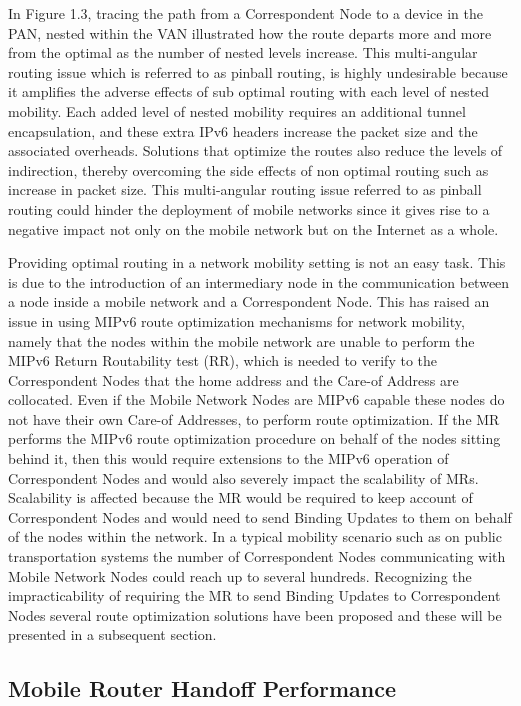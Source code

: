 In Figure 1.3, tracing the path from a Correspondent Node to a device in the
PAN, nested within the VAN illustrated how the route departs more and more
from the optimal as the number of nested levels increase. This multi-angular
routing issue which is referred to as pinball routing, is highly undesirable
because it amplifies the adverse effects of sub optimal routing with each
level of nested mobility. Each added level of nested mobility requires an
additional tunnel encapsulation, and these extra IPv6 headers increase the
packet size and the associated overheads. Solutions that optimize the routes
also reduce the levels of indirection, thereby overcoming the side effects of
non optimal routing such as increase in packet size. This multi-angular routing issue referred to as pinball routing could hinder the deployment of mobile networks since it gives rise to a negative impact not only on the mobile network but on the Internet as a whole.

Providing optimal routing in a network mobility setting is not an easy task.
This is due to the introduction of an intermediary node in the communication
between a node inside a mobile network and a Correspondent Node. This has
raised an issue in using MIPv6 route optimization mechanisms for network
mobility, namely that the nodes within the mobile network are unable to
perform the MIPv6 Return Routability test (RR), which is needed to
verify to the Correspondent Nodes that the home address and the Care-of
Address are collocated. Even if the Mobile Network Nodes are MIPv6 capable these nodes do not have their own Care-of Addresses, to perform route optimization. If the MR performs the MIPv6
route optimization procedure on behalf of the nodes sitting behind it, then
this would require extensions to the MIPv6 operation of Correspondent Nodes
and would also severely impact the scalability of MRs. Scalability is affected because
the MR would be required to keep account of Correspondent Nodes and would need to send Binding Updates to them on behalf of the nodes within the network. In a typical
mobility scenario such as on public transportation systems the number of
Correspondent Nodes communicating with Mobile Network Nodes could reach up to
several hundreds. Recognizing the impracticability of requiring the MR to send Binding Updates to Correspondent Nodes several route optimization solutions have been proposed and these will be presented in a subsequent section.

\subsection{Mobile Router Handoff Performance}

